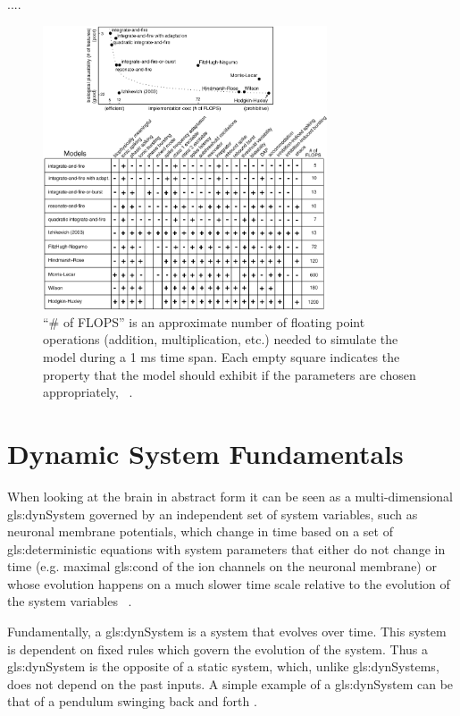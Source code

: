 \documentclass[class={myRUCProject}, crop=false]{standalone}
\begin{document}
....


\begin{figure}[H]
    \centering
    \includegraphics[width = 0.75\textwidth]{Pictures/Kenni/properties_spiking_bursting_models_all.png}
    \caption{“\# of FLOPS” is an approximate number of floating point operations (addition, multiplication, etc.) needed to simulate the model during a 1 ms time span. Each empty square indicates the property that the model should exhibit if the parameters are chosen appropriately, ~\cite{izhikevich2004model}.}
    \label{fig:computational_properties}
\end{figure}






\section{Dynamic System Fundamentals}
When looking at the brain in abstract form it can be seen as a multi-dimensional \gls{gls:dynSystem} governed by an independent set of system variables, such as neuronal membrane potentials, which change in time based on a set of \gls{gls:deterministic} equations with system parameters that either do not change in time (e.g. maximal \gls{gls:cond} of the ion
channels on the neuronal membrane) or whose evolution happens on a much slower time scale relative to the evolution of the system variables ~\cite{STEFANESCU2012748}.


Fundamentally, a \gls{gls:dynSystem} is a system that evolves over time. This system is dependent on fixed rules which govern the evolution of the system. Thus a \gls{gls:dynSystem} is the opposite of a static system, which, unlike \gls{gls:dynSystem}s, does not depend on the past inputs. A simple example of a \gls{gls:dynSystem} can be that of a pendulum swinging back and forth \cite{}. 
\end{document}
